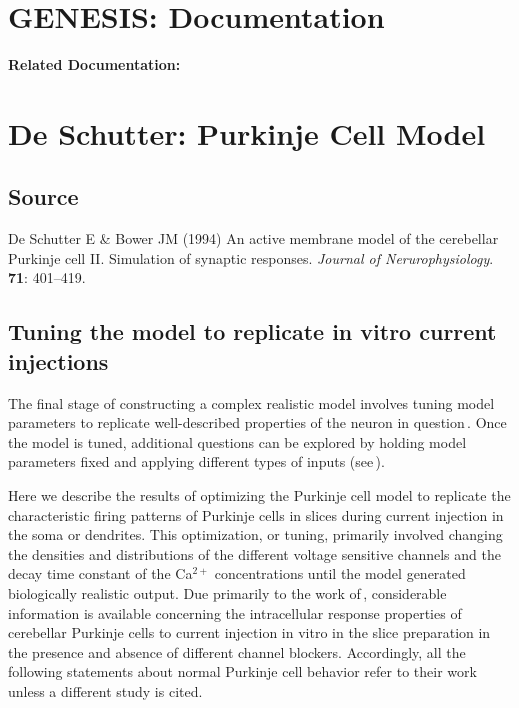\documentclass[12pt]{article}
\begin{document}
\section*{GENESIS: Documentation}

{\bf Related Documentation:}

\section*{De Schutter: Purkinje Cell Model}

\subsection*{Source}

De Schutter E \& Bower JM (1994) An active membrane model of the cerebellar Purkinje cell II. Simulation of synaptic responses. {\it Journal of Nerurophysiology}. {\bf 71}: 401--419.

\subsection*{Tuning the model to replicate in vitro current injections}

The final stage of constructing a complex realistic model involves tuning model parameters to replicate well-described properties of the neuron in question\,\cite{S:1993dz}. Once the model is tuned, additional questions can be explored by holding model parameters fixed and applying different types of inputs (see\,\cite{deschutter94:_purkin_ii}).

Here we  describe the results of optimizing the Purkinje cell model to replicate the characteristic firing patterns of Purkinje cells in slices during current injection in the soma or dendrites. This optimization, or tuning, primarily involved changing the densities and distributions of the different voltage sensitive channels and the decay time constant of the Ca$^{2+}$ concentrations until the model generated biologically realistic output. Due primarily to the work of\,\cite{R:1980ly, R:1980pi}, considerable information is available concerning the intracellular response properties of cerebellar Purkinje cells to current injection in vitro in the slice preparation in the presence and absence of different channel blockers. Accordingly, all the following statements about normal Purkinje cell behavior refer to their work unless a different study is cited.
\end{document}
